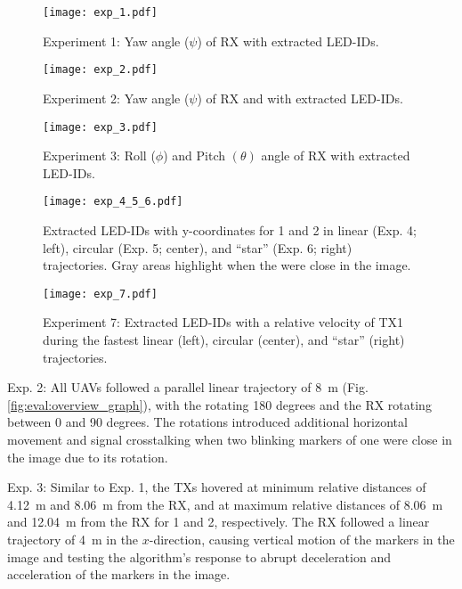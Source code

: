 \documentclass[lettersize,preprint]{elsarticle}
\begin{document}
\begin{figure*}[!ht]
  \centering
\texttt{[image: exp\_1.pdf]}
  \caption{Experiment 1: Yaw angle ($\psi$) of \gls{RX} with extracted \gls{LED}-IDs.}
  \label{fig:eval:exp_1}
\end{figure*}
\begin{figure*}[!ht]
  \centering
\texttt{[image: exp\_2.pdf]}
  \caption{ 
  Experiment 2: Yaw angle ($\psi$) of \gls{RX} and  with extracted \gls{LED}-IDs.}
  \label{fig:eval:exp_2}
\end{figure*}
\begin{figure*}[!ht]
  \centering
\texttt{[image: exp\_3.pdf]}
  \caption{ 
  Experiment 3: Roll ($\phi$) and Pitch $(\theta)$ angle of \gls{RX} with extracted \gls{LED}-IDs.}
  \label{fig:eval:exp_3}
\end{figure*}
\begin{figure*}[!ht]
  \centering
    \texttt{[image: exp\_4\_5\_6.pdf]}
    \caption{Extracted \gls{LED}-IDs with y-coordinates for 1 and 2 in linear (Exp. 4; left), circular (Exp. 5; center), and \enquote{star} (Exp. 6; right) trajectories. Gray areas highlight when the  were close in the image.}
  \label{fig:eval:exp_4_5_6}
\end{figure*}
\begin{figure*}[!ht]
    \texttt{[image: exp\_7.pdf]}
    \caption{Experiment 7: Extracted \gls{LED}-IDs with a relative velocity of \gls{TX}1 during the fastest linear (left), circular (center), and \enquote{star} (right) trajectories.}
  \label{fig:eval:exp_7}
\end{figure*}

Exp. 2: All \glspl{UAV} followed a parallel linear trajectory of \SI{8}{\meter} (Fig. \ref{fig:eval:overview_graph}), with the  rotating 180 degrees and the \gls{RX} rotating between 0 and 90 degrees.
The rotations introduced additional horizontal movement and signal crosstalking when two blinking markers of one  were close in the image due to its rotation.

Exp. 3: Similar to Exp. 1, the \glspl{TX} hovered at minimum relative distances of \SI{4.12}{\meter} and \SI{8.06}{\meter} from the \gls{RX}, and at maximum relative distances of \SI{8.06}{\meter} and \SI{12.04}{\meter} from the \gls{RX} for 1 and 2, respectively.
The \gls{RX} followed a linear trajectory of \SI{4}{\meter} in the $x$-direction, causing vertical motion of the  markers in the image and testing the algorithm's response to abrupt deceleration and acceleration of the markers in the image.
\end{document}

